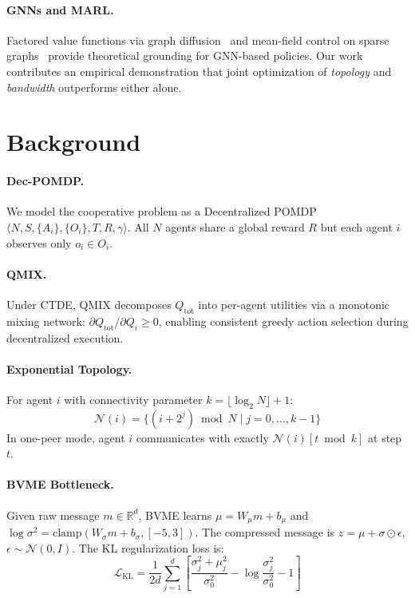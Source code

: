 \documentclass{article}
\begin{document}
\paragraph{GNNs and MARL.}
Factored value functions via graph diffusion~\cite{factored} and mean-field control on sparse graphs~\cite{mfc} provide theoretical grounding for GNN-based policies. Our work contributes an empirical demonstration that joint optimization of \textit{topology} and \textit{bandwidth} outperforms either alone.

\section{Background}
\label{sec:background}

\paragraph{Dec-POMDP.} We model the cooperative problem as a Decentralized POMDP $\langle N, S, \{A_i\}, \{O_i\}, T, R, \gamma \rangle$. All $N$ agents share a global reward $R$ but each agent $i$ observes only $o_i \in O_i$.

\paragraph{QMIX.} Under CTDE, QMIX decomposes $Q_\text{tot}$ into per-agent utilities via a monotonic mixing network: $\partial Q_\text{tot}/\partial Q_i \geq 0$, enabling consistent greedy action selection during decentralized execution.

\paragraph{Exponential Topology.} For agent $i$ with connectivity parameter $k = \lfloor\log_2 N\rfloor + 1$:
\begin{equation}
\mathcal{N}(i) = \{(i + 2^j) \bmod N \mid j = 0,\ldots,k{-}1\}
\end{equation}
In one-peer mode, agent $i$ communicates with exactly $\mathcal{N}(i)[t \bmod k]$ at step $t$.

\paragraph{BVME Bottleneck.} Given raw message $m \in \mathbb{R}^d$, BVME learns $\mu = W_\mu m + b_\mu$ and $\log\sigma^2 = \text{clamp}(W_\sigma m + b_\sigma, [-5,3])$. The compressed message is $z = \mu + \sigma \odot \epsilon$, $\epsilon \sim \mathcal{N}(0,I)$. The KL regularization loss is:
\begin{equation}
\mathcal{L}_\text{KL} = \frac{1}{2d}\sum_{j=1}^d \left[\frac{\sigma_j^2 + \mu_j^2}{\sigma_0^2} - \log\frac{\sigma_j^2}{\sigma_0^2} - 1\right]
\end{equation}
\end{document}
